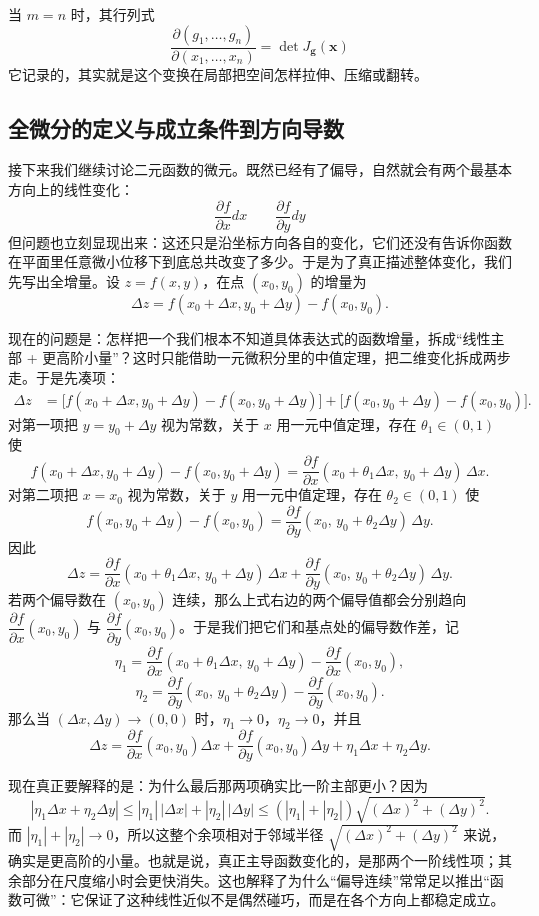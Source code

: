 \documentclass[UTF8]{ctexbook}
\begin{document}
当 $m=n$ 时，其行列式
\[
\dfrac{\partial(g_1,\dots,g_n)}{\partial(x_1,\dots,x_n)}=\det J_{\mathbf{g}}(\mathbf{x})
\]
它记录的，其实就是这个变换在局部把空间怎样拉伸、压缩或翻转。

\subsection{全微分的定义与成立条件到方向导数}

接下来我们继续讨论二元函数的微元。既然已经有了偏导，自然就会有两个最基本方向上的线性变化：
\[
\frac{\partial f}{\partial x}dx\qquad\frac{\partial f}{\partial y}dy
\]
但问题也立刻显现出来：这还只是沿坐标方向各自的变化，它们还没有告诉你函数在平面里任意微小位移下到底总共改变了多少。于是为了真正描述整体变化，我们先写出全增量。设 $z=f(x,y)$，在点 $(x_0,y_0)$ 的增量为
\[
\Delta z=f(x_0+\Delta x,y_0+\Delta y)-f(x_0,y_0).
\]

现在的问题是：怎样把一个我们根本不知道具体表达式的函数增量，拆成“线性主部 + 更高阶小量”？这时只能借助一元微积分里的中值定理，把二维变化拆成两步走。于是先凑项：
\[
\begin{aligned}
\Delta z
&=\bigl[f(x_0+\Delta x,y_0+\Delta y)-f(x_0,y_0+\Delta y)\bigr]
+\bigl[f(x_0,y_0+\Delta y)-f(x_0,y_0)\bigr].
\end{aligned}
\]
对第一项把 $y=y_0+\Delta y$ 视为常数，关于 $x$ 用一元中值定理，存在
$\theta_1\in(0,1)$ 使
\[
f(x_0+\Delta x,y_0+\Delta y)-f(x_0,y_0+\Delta y)
=\frac{\partial f}{\partial x}(x_0+\theta_1\Delta x,\,y_0+\Delta y)\,\Delta x.
\]
对第二项把 $x=x_0$ 视为常数，关于 $y$ 用一元中值定理，存在
$\theta_2\in(0,1)$ 使
\[
f(x_0,y_0+\Delta y)-f(x_0,y_0)
=\frac{\partial f}{\partial y}(x_0,\,y_0+\theta_2\Delta y)\,\Delta y.
\]
因此
\[
\Delta z=\frac{\partial f}{\partial x}(x_0+\theta_1\Delta x,\,y_0+\Delta y)\,\Delta x
+\frac{\partial f}{\partial y}(x_0,\,y_0+\theta_2\Delta y)\,\Delta y.
\]
若两个偏导数在 $(x_0,y_0)$ 连续，那么上式右边的两个偏导值都会分别趋向
$\dfrac{\partial f}{\partial x}(x_0,y_0)$ 与 $\dfrac{\partial f}{\partial y}(x_0,y_0)$。于是我们把它们和基点处的偏导数作差，记
\[
\eta_1=\frac{\partial f}{\partial x}(x_0+\theta_1\Delta x,\,y_0+\Delta y)-\frac{\partial f}{\partial x}(x_0,y_0),
\]
\[
\eta_2=\frac{\partial f}{\partial y}(x_0,\,y_0+\theta_2\Delta y)-\frac{\partial f}{\partial y}(x_0,y_0).
\]
那么当 $(\Delta x,\Delta y)\to(0,0)$ 时，$\eta_1\to0$，$\eta_2\to0$，并且
\[
\Delta z=\frac{\partial f}{\partial x}(x_0,y_0)\Delta x+\frac{\partial f}{\partial y}(x_0,y_0)\Delta y+\eta_1\Delta x+\eta_2\Delta y.
\]

现在真正要解释的是：为什么最后那两项确实比一阶主部更小？因为
\[
|\eta_1\Delta x+\eta_2\Delta y|
\le |\eta_1|\,|\Delta x|+|\eta_2|\,|\Delta y|
\le (|\eta_1|+|\eta_2|)\sqrt{(\Delta x)^2+(\Delta y)^2}.
\]
而 $|\eta_1|+|\eta_2|\to0$，所以这整个余项相对于邻域半径
$\sqrt{(\Delta x)^2+(\Delta y)^2}$ 来说，确实是更高阶的小量。也就是说，真正主导函数变化的，是那两个一阶线性项；其余部分在尺度缩小时会更快消失。这也解释了为什么“偏导连续”常常足以推出“函数可微”：它保证了这种线性近似不是偶然碰巧，而是在各个方向上都稳定成立。
\end{document}
